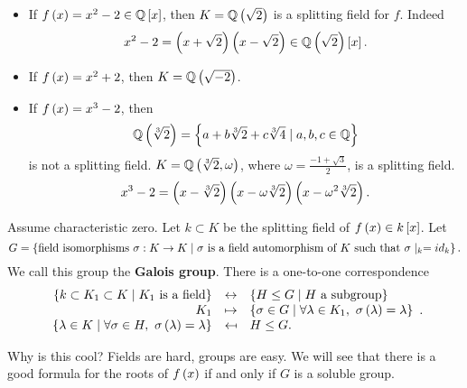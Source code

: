 \begin{example1}
\hfill
\begin{itemize}
\item If $ f\left( x \right) = x^2 - 2 \in \mathbb{Q}\left[ x \right] $, then $ K = \mathbb{Q}\left( \sqrt{2} \right) $ is a splitting field for $ f $. Indeed
$$ x^2 - 2 =\left( x + \sqrt{2} \right)\left( x - \sqrt{2} \right) \in \mathbb{Q}\left( \sqrt{2} \right)\left[ x \right]. $$
\item If $ f\left( x \right) = x^2 + 2 $, then $ K = \mathbb{Q}\left( \sqrt{-2} \right) $.
\item If $ f\left( x \right) = x^3 - 2 $, then
$$ \mathbb{Q}\left( \sqrt[3]{2} \right) = \left\{ a + b\sqrt[3]{2} + c\sqrt[3]{4} \mid a, b, c \in \mathbb{Q} \right\} $$
is not a splitting field. $ K = \mathbb{Q}\left( \sqrt[3]{2}, \omega \right) $, where $ \omega = \tfrac{-1 + \sqrt{3}}{2} $, is a splitting field.
$$ x^3 - 2 = \left( x - \sqrt[3]{2} \right)\left( x - \omega\sqrt[3]{2} \right)\left( x - \omega^2\sqrt[3]{2} \right). $$
\end{itemize}
\end{example1}

\begin{theorem}
\label{thm:galoiscorrespondence}
Assume characteristic zero. Let $ k \subset K $ be the splitting field of $ f\left( x \right) \in k\left[ x \right] $. Let
$$ G = \left\{ \text{field isomorphisms} \ \sigma : K \to K \mid \sigma \ \text{is a field automorphism of} \ K \ \text{such that} \ \sigma\mid_{k} = id_k \right\}. $$
We call this group the \textbf{Galois group}. There is a one-to-one correspondence
$$
\begin{array}{rcl}
\cb{k \subset K_1 \subset K \mid K_1 \ \text{is a field}} & \leftrightarrow & \cb{H \le G \mid H \ \text{a subgroup}} \\
K_1 & \mapsto & \cb{\sigma \in G \mid \forall \lambda \in K_1, \ \sigma\rb{\lambda} = \lambda} \\
\cb{\lambda \in K \mid \forall \sigma \in H, \ \sigma\rb{\lambda} = \lambda} & \mapsfrom & H \le G.
\end{array}.
$$
\end{theorem}

Why is this cool? Fields are hard, groups are easy. We will see that there is a good formula for the roots of $ f\left( x \right) $ if and only if $ G $ is a soluble group.


